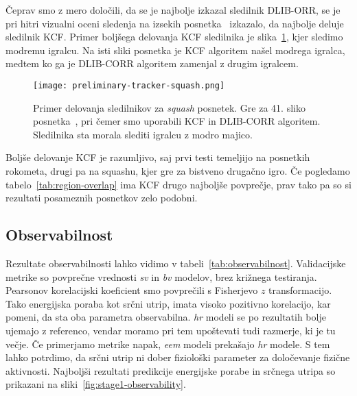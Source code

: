 Čeprav smo z mero določili, da se je najbolje izkazal sledilnik DLIB-ORR, se je pri hitri vizualni oceni sledenja na izsekih posnetka~\cite{squashtv2014squash} izkazalo, da najbolje deluje sledilnik KCF. Primer boljšega delovanja KCF sledilnika je slika~\ref{fig:squash-tracker-visual}, kjer sledimo modremu igralcu. Na isti sliki posnetka je KCF algoritem našel modrega igralca, medtem ko ga je DLIB-CORR algoritem zamenjal z drugim igralcem. 



\begin{figure}[!htbp]
	\centering
	\texttt{[image: preliminary-tracker-squash.png]}
	\caption[Primer delovanja sledilnikov za \textit{squash} posnetek]{Primer delovanja sledilnikov za \textit{squash} posnetek. Gre za 41. sliko posnetka~\cite{squashtv2014squash}, pri čemer smo uporabili KCF in DLIB-CORR algoritem. Sledilnika sta morala slediti igralcu z modro majico.}
	\label{fig:squash-tracker-visual}
\end{figure}


Boljše delovanje KCF je razumljivo, saj prvi testi temeljijo na posnetkih rokometa, drugi pa na squashu, kjer gre za bistveno drugačno igro. Če pogledamo tabelo~\ref{tab:region-overlap} ima KCF drugo najboljše povprečje, prav tako pa so si rezultati posameznih posnetkov zelo podobni. 


















\subsection{Observabilnost}
Rezultate observabilnosti lahko vidimo v tabeli~\ref{tab:observabilnost}. Validacijske metrike so povprečne vrednosti \textit{sv} in \textit{bv} modelov, brez križnega testiranja.  Pearsonov korelacijski koeficient smo povprečili s Fisherjevo $z$ transformacijo. Tako energijska poraba kot srčni utrip, imata visoko pozitivno korelacijo, kar pomeni, da sta oba parametra observabilna. \textit{hr} modeli se po \corr rezultatih bolje ujemajo z referenco, vendar moramo pri tem upoštevati tudi \nsv razmerje, ki je tu večje. Če primerjamo metrike napak, \textit{eem} modeli prekašajo \textit{hr} modele. S tem lahko potrdimo, da srčni utrip ni dober fiziološki parameter za določevanje fizične aktivnosti. Najboljši rezultati predikcije energijske porabe in srčnega utripa so prikazani na sliki~\ref{fig:stage1-observability}.

